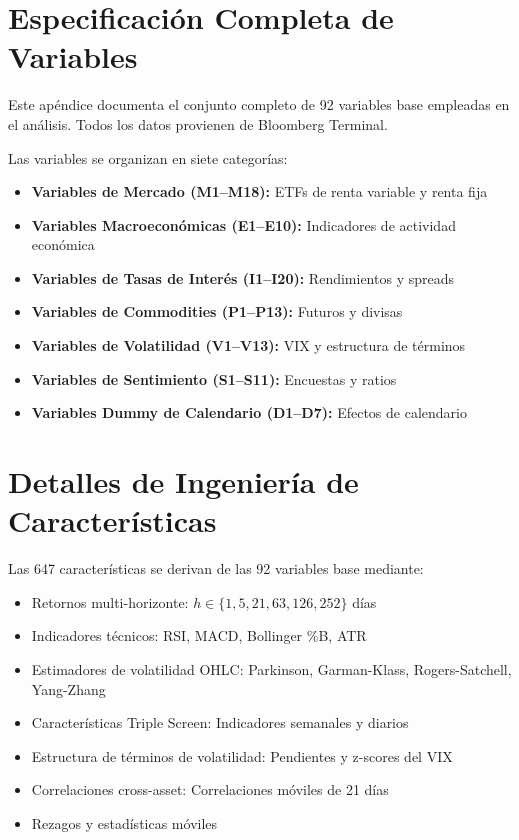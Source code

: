 \documentclass[11pt,a4paper]{article}
\begin{document}
\newpage
\appendix

\section{Especificaci\'on Completa de Variables}

Este ap\'endice documenta el conjunto completo de 92 variables base empleadas en el an\'alisis. Todos los datos provienen de Bloomberg Terminal.

Las variables se organizan en siete categor\'ias:
\begin{itemize}[noitemsep]
    \item \textbf{Variables de Mercado (M1--M18):} ETFs de renta variable y renta fija
    \item \textbf{Variables Macroecon\'omicas (E1--E10):} Indicadores de actividad econ\'omica
    \item \textbf{Variables de Tasas de Inter\'es (I1--I20):} Rendimientos y spreads
    \item \textbf{Variables de Commodities (P1--P13):} Futuros y divisas
    \item \textbf{Variables de Volatilidad (V1--V13):} VIX y estructura de t\'erminos
    \item \textbf{Variables de Sentimiento (S1--S11):} Encuestas y ratios
    \item \textbf{Variables Dummy de Calendario (D1--D7):} Efectos de calendario
\end{itemize}

\section{Detalles de Ingenier\'ia de Caracter\'isticas}

Las 647 caracter\'isticas se derivan de las 92 variables base mediante:

\begin{itemize}[noitemsep]
    \item Retornos multi-horizonte: $h \in \{1, 5, 21, 63, 126, 252\}$ d\'ias
    \item Indicadores t\'ecnicos: RSI, MACD, Bollinger \%B, ATR
    \item Estimadores de volatilidad OHLC: Parkinson, Garman-Klass, Rogers-Satchell, Yang-Zhang
    \item Caracter\'isticas Triple Screen: Indicadores semanales y diarios
    \item Estructura de t\'erminos de volatilidad: Pendientes y z-scores del VIX
    \item Correlaciones cross-asset: Correlaciones m\'oviles de 21 d\'ias
    \item Rezagos y estad\'isticas m\'oviles
\end{itemize}
\end{document}

